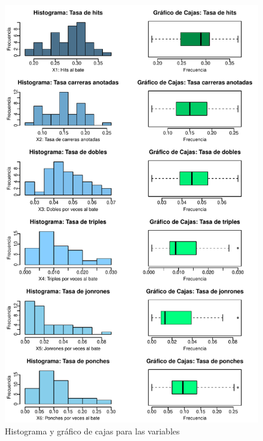 \documentclass{staprojteamusb}
\begin{document}
  \begin{figure}[h]
  	\centering
  	\includegraphics{C03322-InformeFinal-Cordero-Gavazut-Riera_files/figure-latex/boxplots-1.pdf}
  	\caption{\label{fig:boxplots}Histograma y gráfico de cajas para las variables}
  \end{figure}
 
 \newpage
 
\end{document}

